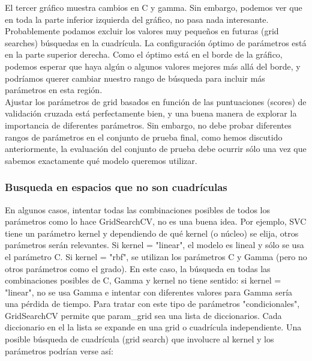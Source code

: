 El tercer gráfico muestra cambios en C y gamma. Sin embargo, podemos ver que en 
toda la parte inferior izquierda del gráfico, no pasa nada interesante. Probablemente podamos
excluir los valores muy pequeños en  futuras (grid searches)  búsquedas en la cuadrícula. 
La configuración  óptimo de parámetros  está en la parte superior derecha. Como el óptimo está en el borde de la gráfico, podemos esperar que haya algún o algunos valores mejores  más allá del borde, y podríamos querer cambiar nuestro rango de búsqueda para incluir más parámetros en esta región.\\


Ajustar los  parámetros de grid  basados   en función de las  puntuaciones (scores)  de validación cruzada está  perfectamente bien, y una buena manera de explorar la importancia de diferentes parámetros. Sin embargo, no debe probar diferentes rangos de parámetros en el conjunto de prueba final, como hemos discutido anteriormente, la evaluación del conjunto de prueba debe ocurrir sólo una vez que sabemos exactamente qué modelo queremos utilizar.


\subsubsection{Busqueda en espacios que no son cuadrículas}\label{Pagina1}





En algunos casos, intentar todas las combinaciones posibles de todos los parámetros como lo hace {\ttfamily  GridSearchCV}, no es una buena idea. Por ejemplo, SVC tiene un parámetro  kernel y
dependiendo de qué kernel  (o  núcleo) se elija, otros parámetros serán relevantes.    Si kernel = "{}linear"{}, el modelo es lineal y sólo se usa el parámetro C.  Si kernel = "{}rbf"{},
se utilizan los parámetros C y {\ttfamily  Gamma} (pero no otros parámetros como el grado). 
En este caso, la búsqueda en todas las combinaciones posibles de C, {\ttfamily  Gamma} y kernel no
tiene sentido:  si kernel = "{}linear"{}, no se usa {\ttfamily  Gamma} e intentar con  diferentes valores para
{\ttfamily  Gamma} sería una pérdida de tiempo. Para tratar con este tipo de parámetros "{}condicionales"{},
\: {\ttfamily GridSearchCV} permite que {\ttfamily param\_grid} sea una lista de diccionarios. Cada diccionario en el la lista se expande en una grid o cuadrícula independiente. Una posible   búsqueda de cuadrícula (grid search) que  involucre al kernel y los parámetros podrían verse así:
 
